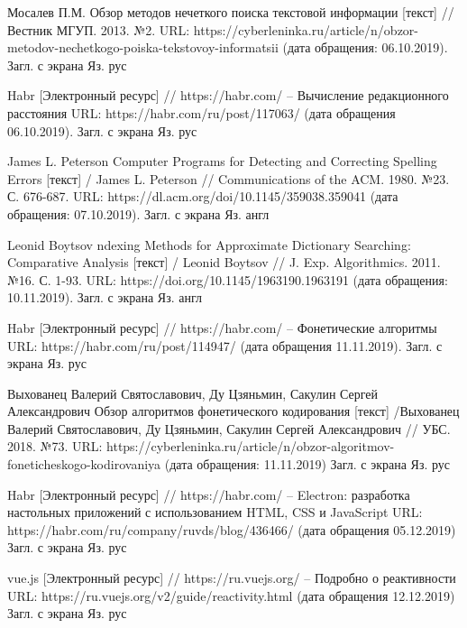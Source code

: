 \begin{thebibliography}{}
 Мосалев П.М. Обзор методов нечеткого поиска текстовой информации [текст] // Вестник МГУП. 2013. №2. URL: https://cyberleninka.ru/article/n/obzor-metodov-nechetkogo-poiska-tekstovoy-informatsii (дата обращения: 06.10.2019). Загл. с экрана Яз. рус

 Habr [Электронный ресурс] // https://habr.com/ -- Вычисление редакционного расстояния URL:
https://habr.com/ru/post/117063/ (дата обращения 06.10.2019). Загл. с экрана Яз. рус

 James L. Peterson Computer Programs for Detecting and Correcting Spelling Errors [текст] / James L. Peterson // Communications of the ACM. 1980. №23. С. 676-687. URL: https://dl.acm.org/doi/10.1145/359038.359041 (дата обращения: 07.10.2019). Загл. с экрана Яз. англ

 Leonid Boytsov ndexing Methods for Approximate Dictionary Searching: Comparative Analysis [текст] / Leonid Boytsov // J. Exp. Algorithmics. 2011. №16. С. 1-93. URL: https://doi.org/10.1145/1963190.1963191 (дата обращения: 10.11.2019). Загл. с экрана Яз. англ

 Habr [Электронный ресурс] // https://habr.com/ -- Фонетические алгоритмы URL: https://habr.com/ru/post/114947/ (дата обращения 11.11.2019). Загл. с экрана Яз. рус

 Выхованец Валерий Святославович, Ду Цзяньмин, Сакулин Сергей Александрович Обзор алгоритмов фонетического кодирования [текст] /Выхованец Валерий Святославович, Ду Цзяньмин, Сакулин Сергей Александрович // УБС. 2018. №73. URL: https://cyberleninka.ru/article/n/obzor-algoritmov-foneticheskogo-kodirovaniya (дата обращения: 11.11.2019) Загл. с экрана Яз. рус

 Habr [Электронный ресурс] // https://habr.com/ -- Electron: разработка настольных приложений с использованием HTML, CSS и JavaScript URL: https://habr.com/ru/company/ruvds/blog/436466/ (дата обращения 05.12.2019) Загл. с экрана Яз. рус

 vue.js [Электронный ресурс] // https://ru.vuejs.org/ -- Подробно о реактивности URL: https://ru.vuejs.org/v2/guide/reactivity.html (дата обращения 12.12.2019) Загл. с экрана Яз. рус
\end{thebibliography}
